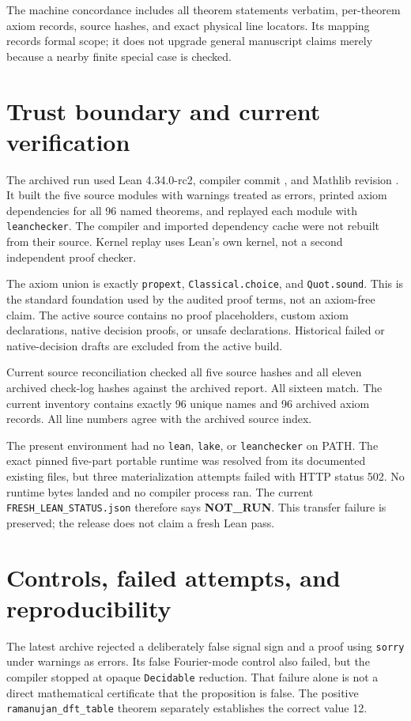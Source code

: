 The machine concordance includes all theorem statements verbatim, per-theorem
axiom records, source hashes, and exact physical line locators. Its mapping
records formal scope; it does not upgrade general manuscript claims merely
because a nearby finite special case is checked.

\section{Trust boundary and current verification}
The archived run used Lean 4.34.0-rc2, compiler commit
\texttt{}, and Mathlib revision
\texttt{}.
It built the five source modules with warnings treated as errors, printed axiom
dependencies for all 96 named theorems, and replayed each module with
\texttt{leanchecker}. The compiler and imported dependency cache were not rebuilt
from their source. Kernel replay uses Lean's own kernel, not a second independent
proof checker.

The axiom union is exactly \texttt{propext}, \texttt{Classical.choice}, and
\texttt{Quot.sound}. This is the standard foundation used by the audited proof
terms, not an axiom-free claim. The active source contains no proof placeholders,
custom axiom declarations, native decision proofs, or unsafe declarations.
Historical failed or native-decision drafts are excluded from the active build.

Current source reconciliation checked all five source hashes and all eleven
archived check-log hashes against the archived report. All sixteen match.
The current inventory contains exactly 96 unique names and 96 archived axiom
records. All line numbers agree with the archived source index.

The present environment had no \texttt{lean}, \texttt{lake}, or
\texttt{leanchecker} on PATH. The exact pinned five-part portable runtime was
resolved from its documented existing files, but three materialization attempts
failed with HTTP status 502. No runtime bytes landed and no compiler process ran.
The current \texttt{FRESH\_LEAN\_STATUS.json} therefore says
\textbf{NOT\_RUN}. This transfer failure is preserved; the release does not claim
a fresh Lean pass.

\section{Controls, failed attempts, and reproducibility}
The latest archive rejected a deliberately false signal sign and a proof using
\texttt{sorry} under warnings as errors. Its false Fourier-mode control also
failed, but the compiler stopped at opaque \texttt{Decidable} reduction. That
failure alone is not a direct mathematical certificate that the proposition is
false. The positive \texttt{ramanujan\_dft\_table} theorem separately establishes
the correct value 12.

